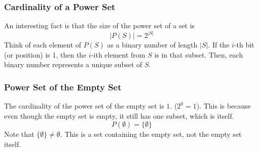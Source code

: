 \documentclass[10pt]{article}
\begin{document}
\subsubsection*{Cardinality of a Power Set}
An interesting fact is that the size of the power set of a set is
\[|P(S)| = 2^{|S|}\]
Think of each element of $P(S)$ as a binary number of length $|S|$.  If the $i$-th bit (or position) is 1, then the $i$-ith element from $S$ is in that subset.  Then, each binary number represents a unique subset of $S$.

\subsubsection*{Power Set of the Empty Set}
The cardinality of the power set of the empty set is $1$.  ($2^0 = 1$).  This is because even though the empty set is empty, it still has one subset, which is itself.
\[P(\emptyset) = \{\emptyset\}\]
Note that $\{\emptyset\} \neq \emptyset$.  This is a set containing the empty set, not the empty set itself.
\end{document}
